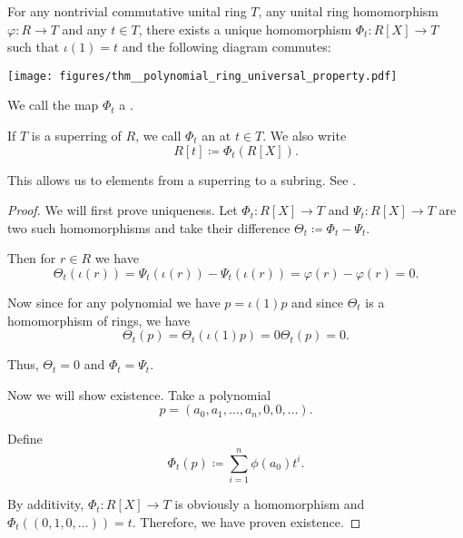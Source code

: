 \begin{proposition}\label{thm:polynomial_ring_universal_property}
  For any nontrivial commutative unital ring \( T \), any unital ring homomorphism \( \varphi: R \to T \) and any \( t \in T \), there exists a unique homomorphism \( \Phi_t: R[X] \to T \) such that \( \iota(1) = t \) and the following diagram commutes:

  \begin{alignedeq}\label{thm:polynomial_ring_universal_property/diagram}
    \texttt{[image: figures/thm\_\_polynomial\_ring\_universal\_property.pdf]}
  \end{alignedeq}

  We call the map \( \Phi_t \) a .

  If \( T \) is a superring of \( R \), we call \( \Phi_t \) an  at \( t \in T \). We also write
  \begin{equation}
    R[t] \coloneqq \Phi_t(R[X]).
  \end{equation}

  This allows us to  elements from a superring to a subring. See .
\end{proposition}
\begin{proof}
  We will first prove uniqueness. Let \( \Phi_t: R[X] \to T \) and \( \Psi_t: R[X] \to T \) are two such homomorphisms and take their difference \( \Theta_t \coloneqq \Phi_t - \Psi_t \).

  Then for \( r \in R \) we have
  \begin{equation*}
    \Theta_t(\iota(r)) = \Psi_t(\iota(r)) - \Psi_t(\iota(r)) = \varphi(r) - \varphi(r) = 0.
  \end{equation*}

  Now since for any polynomial we have \( p = \iota(1) p \) and since \( \Theta_t \) is a homomorphism of rings, we have
  \begin{equation*}
    \Theta_t(p) = \Theta_t(\iota(1) p) = 0 \Theta_t(p) = 0.
  \end{equation*}

  Thus, \( \Theta_t = 0 \) and \( \Phi_t = \Psi_t \).

  Now we will show existence. Take a polynomial
  \begin{equation*}
    p = (a_0, a_1, \ldots, a_n, 0, 0, \ldots).
  \end{equation*}

  Define
  \begin{equation*}
    \Phi_t(p) \coloneqq \sum_{i=1}^n \phi(a_0) t^i.
  \end{equation*}

  By additivity, \( \Phi_t: R[X] \to T \) is obviously a homomorphism and \( \Phi_t((0, 1, 0, \ldots)) = t \). Therefore, we have proven existence.
\end{proof}

